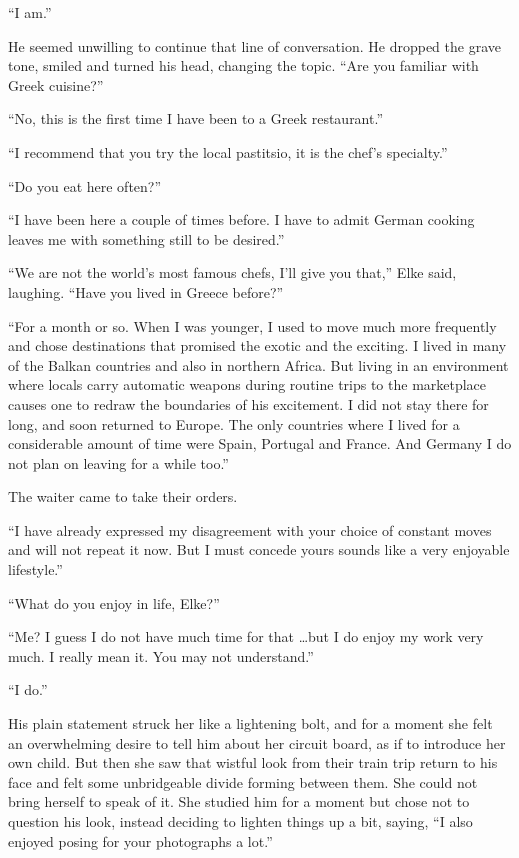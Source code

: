 ``I am.''

He seemed unwilling to continue that line of conversation. He dropped the grave tone, smiled and turned his head, changing the topic. ``Are you familiar with Greek cuisine?''

``No, this is the first time I have been to a Greek restaurant.''

``I recommend that you try the local pastitsio, it is the chef's specialty.''

``Do you eat here often?''

``I have been here a couple of times before. I have to admit German cooking leaves me with something still to be desired.''

``We are not the world's most famous chefs, I'll give you that,'' Elke said, laughing. ``Have you lived in Greece before?''

``For a month or so. When I was younger, I used to move much more frequently and chose destinations that promised the exotic and the exciting. I lived in many of the Balkan countries and also in northern Africa. But living in an environment where locals carry automatic weapons during routine trips to the marketplace causes one to redraw the boundaries of his excitement. I did not stay there for long, and soon returned to Europe. The only countries where I lived for a considerable amount of time were Spain, Portugal and France. And Germany I do not plan on leaving for a while too.''

The waiter came to take their orders.

``I have already expressed my disagreement with your choice of constant moves and will not repeat it now. But I must concede yours sounds like a very enjoyable lifestyle.''

``What do you enjoy in life, Elke?''

``Me? I guess I do not have much time for that \ldots but I do enjoy my work very much. I really mean it. You may not understand.''

``I do.''

His plain statement struck her like a lightening bolt, and for a moment she felt an overwhelming desire to tell him about her circuit board, as if to introduce her own child. But then she saw that wistful look from their train trip return to his face and felt some unbridgeable divide forming between them. She could not bring herself to speak of it. She studied him for a moment but chose not to question his look, instead deciding to lighten things up a bit, saying, ``I also enjoyed posing for your photographs a lot.''

